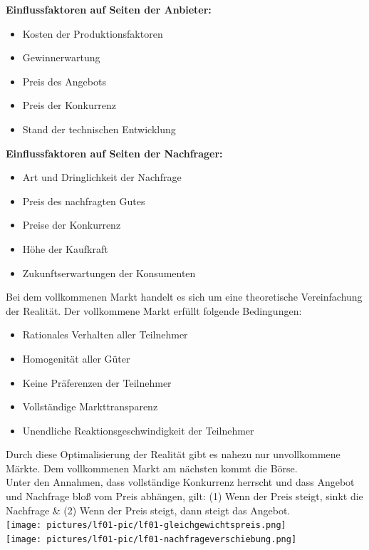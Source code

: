 {\bf Einflussfaktoren auf Seiten der Anbieter:}
\begin{itemize}
	\item Kosten der Produktionsfaktoren
	\item Gewinnerwartung
	\item Preis des Angebots
	\item Preis der Konkurrenz
	\item Stand der technischen Entwicklung
\end{itemize}

{\bf Einflussfaktoren auf Seiten der Nachfrager: }
\begin{itemize}
	\item Art und Dringlichkeit der Nachfrage
	\item Preis des nachfragten Gutes
	\item Preise der Konkurrenz
	\item Höhe der Kaufkraft
	\item Zukunftserwartungen der Konsumenten
\end{itemize}

Bei dem vollkommenen Markt handelt es sich um eine theoretische Vereinfachung der Realität. Der vollkommene Markt erfüllt folgende Bedingungen:

\begin{itemize}
	\item Rationales Verhalten aller Teilnehmer
	\item Homogenität aller Güter
	\item Keine Präferenzen der Teilnehmer
	\item Vollständige Markttransparenz
	\item Unendliche Reaktionsgeschwindigkeit der Teilnehmer
\end{itemize}

Durch diese Optimalisierung der Realität gibt es nahezu nur unvollkommene Märkte. Dem vollkommenen Markt am nächsten kommt die Börse. \\

Unter den Annahmen, dass vollständige Konkurrenz herrscht und dass Angebot und Nachfrage bloß vom Preis abhängen, gilt: (1) Wenn der Preis steigt, sinkt die Nachfrage \& (2) Wenn der Preis steigt, dann steigt das Angebot.\\

\texttt{[image: pictures/lf01-pic/lf01-gleichgewichtspreis.png]}\\
\texttt{[image: pictures/lf01-pic/lf01-nachfrageverschiebung.png]}

